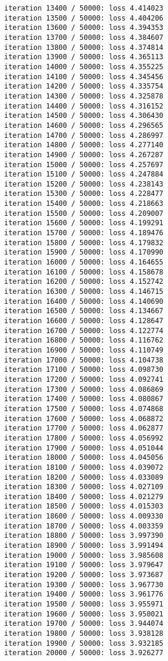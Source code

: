 \documentclass[11pt]{article}
\begin{document}
\begin{Verbatim}[commandchars=\\\{\}]
iteration 13400 / 50000: loss 4.414023
iteration 13500 / 50000: loss 4.404206
iteration 13600 / 50000: loss 4.394353
iteration 13700 / 50000: loss 4.384607
iteration 13800 / 50000: loss 4.374814
iteration 13900 / 50000: loss 4.365113
iteration 14000 / 50000: loss 4.355225
iteration 14100 / 50000: loss 4.345456
iteration 14200 / 50000: loss 4.335754
iteration 14300 / 50000: loss 4.325878
iteration 14400 / 50000: loss 4.316152
iteration 14500 / 50000: loss 4.306430
iteration 14600 / 50000: loss 4.296565
iteration 14700 / 50000: loss 4.286997
iteration 14800 / 50000: loss 4.277140
iteration 14900 / 50000: loss 4.267287
iteration 15000 / 50000: loss 4.257697
iteration 15100 / 50000: loss 4.247884
iteration 15200 / 50000: loss 4.238143
iteration 15300 / 50000: loss 4.228477
iteration 15400 / 50000: loss 4.218663
iteration 15500 / 50000: loss 4.209007
iteration 15600 / 50000: loss 4.199291
iteration 15700 / 50000: loss 4.189476
iteration 15800 / 50000: loss 4.179832
iteration 15900 / 50000: loss 4.170990
iteration 16000 / 50000: loss 4.164655
iteration 16100 / 50000: loss 4.158678
iteration 16200 / 50000: loss 4.152742
iteration 16300 / 50000: loss 4.146715
iteration 16400 / 50000: loss 4.140690
iteration 16500 / 50000: loss 4.134667
iteration 16600 / 50000: loss 4.128647
iteration 16700 / 50000: loss 4.122774
iteration 16800 / 50000: loss 4.116762
iteration 16900 / 50000: loss 4.110749
iteration 17000 / 50000: loss 4.104738
iteration 17100 / 50000: loss 4.098730
iteration 17200 / 50000: loss 4.092741
iteration 17300 / 50000: loss 4.086869
iteration 17400 / 50000: loss 4.080867
iteration 17500 / 50000: loss 4.074868
iteration 17600 / 50000: loss 4.068872
iteration 17700 / 50000: loss 4.062877
iteration 17800 / 50000: loss 4.056992
iteration 17900 / 50000: loss 4.051044
iteration 18000 / 50000: loss 4.045056
iteration 18100 / 50000: loss 4.039072
iteration 18200 / 50000: loss 4.033089
iteration 18300 / 50000: loss 4.027109
iteration 18400 / 50000: loss 4.021279
iteration 18500 / 50000: loss 4.015303
iteration 18600 / 50000: loss 4.009330
iteration 18700 / 50000: loss 4.003359
iteration 18800 / 50000: loss 3.997390
iteration 18900 / 50000: loss 3.991494
iteration 19000 / 50000: loss 3.985608
iteration 19100 / 50000: loss 3.979647
iteration 19200 / 50000: loss 3.973687
iteration 19300 / 50000: loss 3.967730
iteration 19400 / 50000: loss 3.961776
iteration 19500 / 50000: loss 3.955971
iteration 19600 / 50000: loss 3.950021
iteration 19700 / 50000: loss 3.944074
iteration 19800 / 50000: loss 3.938128
iteration 19900 / 50000: loss 3.932185
iteration 20000 / 50000: loss 3.926277

\end{Verbatim}
\end{document}
